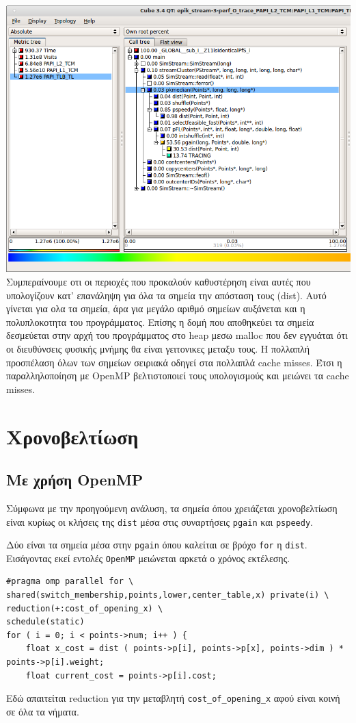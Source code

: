 \documentclass[a4paper,11pt]{article}
\begin{document}
\includegraphics[width=\textwidth]{../scrshots/tlb.png}
Συμπεραίνουμε οτι οι περιοχές που προκαλούν καθυστέρηση είναι αυτές που υπολογίζουν κατ' επανάληψη για όλα τα σημεία την απόσταση τους (dist). Αυτό γίνεται για ολα τα σημεία, άρα για μεγάλο αριθμό σημείων αυξάνεται και η πολυπλοκοτητα του προγράμματος. Επίσης η δομή που αποθηκεύει τα σημεία δεσμεύεται στην αρχή του προγράμματος στο heap μεσω malloc που δεν εγγυάται ότι οι διευθύνσεις φυσικής μνήμης θα είναι γειτονικες μεταξυ τους. Η πολλαπλή προσπέλαση όλων των σημείων σειριακά οδηγεί στα
πολλαπλά cache misses. Έτσι η παραλληλοποίηση με OpenMP βελτιστοποιεί τους υπολογισμούς και μειώνει τα cache misses.

\section{Χρονοβελτίωση}
\subsection{Με χρήση OpenMP}
Σύμφωνα με την προηγούμενη ανάλυση, τα σημεία όπου χρειάζεται χρονοβελτίωση είναι κυρίως οι κλήσεις της \texttt{dist} μέσα στις συναρτήσεις \texttt{pgain} και \texttt{pspeedy}.

Δύο είναι τα σημεία μέσα στην \texttt{pgain} όπου καλείται σε βρόχο \texttt{for} η \texttt{dist}. Εισάγοντας εκεί εντολές \texttt{OpenMP} μειώνεται αρκετά ο χρόνος εκτέλεσης.
\begin{lstlisting}
#pragma omp parallel for \
shared(switch_membership,points,lower,center_table,x) private(i) \
reduction(+:cost_of_opening_x) \
schedule(static)
for ( i = 0; i < points->num; i++ ) {
    float x_cost = dist ( points->p[i], points->p[x], points->dim ) * points->p[i].weight;
    float current_cost = points->p[i].cost;
\end{lstlisting}
Εδώ απαιτείται reduction για την μεταβλητή \texttt{cost\_of\_opening\_x} αφού είναι κοινή σε όλα τα νήματα.
\end{document}
